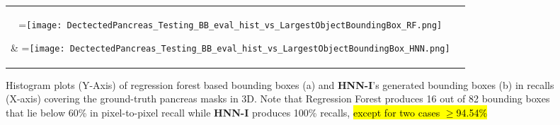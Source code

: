 \documentclass[journal]{IEEEtran}
\newcommand*{\vcenteredhbox}[1]{\begingroup\setbox0=\hbox{#1}\parbox{\wd0}{\box0}\endgroup}
\begin{document}
\begin{figure}[htb]%
	\centering
	\begin{tabular}{cc}
			\vcenteredhbox{\texttt{[image: DectectedPancreas\_Testing\_BB\_eval\_hist\_vs\_LargestObjectBoundingBox\_RF.png]}} &
			\vcenteredhbox{\texttt{[image: DectectedPancreas\_Testing\_BB\_eval\_hist\_vs\_LargestObjectBoundingBox\_HNN.png]}} \\
			(a) regression forest & (b) \textbf{HNN-I}\\
	\end{tabular}
	\caption{\small Histogram plots (Y-Axis) of regression forest based bounding boxes (a) and \textbf{HNN-I}'s generated bounding boxes (b) in recalls (X-axis) covering the ground-truth pancreas masks in 3D. Note that Regression Forest produces 16 out of 82 bounding boxes that lie below 60\% in pixel-to-pixel recall while \textbf{HNN-I} produces 100\% recalls, \hl{except for two cases $\geq$94.54\%}}		
	\label{fig:recall_histograms}
\end{figure}
\end{document}
